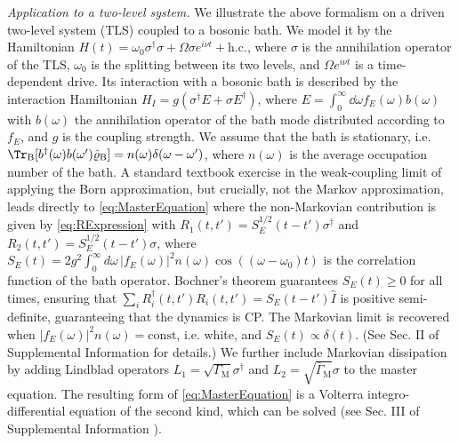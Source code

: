 \documentclass[
    11pt,
    letterpaper,
    reprint,
    notitlepage,
    superscriptaddress,
    aps,prx
]{revtex4-2}
\renewcommand{\t}[1]{\mathrm{#1}}
\renewcommand{\rho}{\varrho}
\begin{document}
\emph{Application to a two-level system.}
We illustrate the above formalism on a driven two-level system (TLS) coupled to a bosonic bath. 
We model it by the Hamiltonian $H(t) = \omega_0 \sigma^\dagger \sigma 
+ \Omega \sigma e^{i \nu t} + \mathrm{h.c.}$, where $\sigma$ is the annihilation operator of 
the TLS, $\omega_0$ is the splitting between its two levels, and $\Omega e^{i \nu t}$ is a time-dependent drive.
Its interaction with a bosonic bath is described by the interaction Hamiltonian 
$H_I = g(\sigma^\dagger E + \sigma E^\dagger)$, where $E = \int_0^\infty \dd{\omega}
f_E(\omega)b(\omega)$ with $b(\omega)$ the annihilation operator of the bath mode 
distributed according to $f_E$, and $g$ is the coupling strength.
We assume that the bath is stationary, i.e. $\Tr_\t{B} [b^\dagger(\omega) b(\omega^\prime) \hat \rho_\mathrm{B}] = n(\omega) \delta(\omega - \omega^\prime)$, where $n(\omega)$ is the average 
occupation number of the bath.
A standard textbook exercise in the weak-coupling limit \cite{BP02} of applying the Born approximation, but crucially, not the Markov approximation, leads directly 
to \cref{eq:MasterEquation} where the non-Markovian contribution is given by 
\cref{eq:RExpression} with ${R_1(t, t') 
= S_E^{1/2}(t-t')\sigma^\dagger}$ and ${R_2(t,t') = S_E^{1/2}(t-t')\sigma}$,
where $S_E(t) = 2 g^2 \int_0^\infty d\omega\,|f_E(\omega)|^2 n(\omega)\cos((\omega-\omega_0)t)$
is the correlation function of the bath operator.
Bochner's theorem guarantees $S_E(t) \geq 0$ for all times, ensuring 
that $\sum_{i} R_i^\dagger(t, t') R_i(t, t') = S_E(t - t') \hat I$ is 
positive semi-definite, guaranteeing that the dynamics is CP.
The Markovian limit is recovered when $|f_E(\omega)|^2 n(\omega) = \mathrm{const}$, i.e. white, 
and $S_E(t) \propto \delta(t)$.
(See Sec. II of Supplemental Information \cite{Supplement} for details.)
We further include Markovian dissipation by adding Lindblad operators 
$L_1 = \sqrt{\Gamma_\mathrm{M}} \sigma^\dagger$ and $L_2 = \sqrt{\bar \Gamma_\mathrm{M}} \sigma$ 
to the master equation.
The resulting form of  \cref{eq:MasterEquation} is a Volterra integro-differential equation of 
the second kind, which can be solved (see Sec. III of Supplemental Information \cite{Supplement}).
\end{document}
